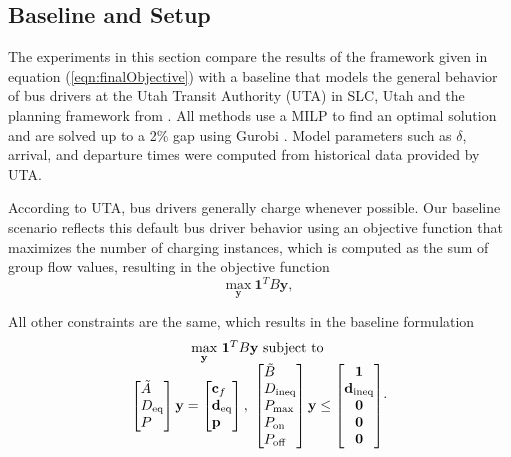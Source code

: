 \subsection{\label{sec:setup} Baseline and Setup}
The experiments in this section compare the results of the framework given in equation (\ref{eqn:finalObjective}) with a baseline that models the general behavior of bus drivers at the Utah Transit Authority (UTA) in SLC, Utah and the planning framework from \cite{He_2022_Battery}. All methods use a MILP to find an optimal solution and are solved up to a 2\% gap using Gurobi \cite{gurobi}. Model parameters such as $\delta$, arrival, and departure times were computed from historical data provided by UTA.
\par According to UTA, bus drivers generally charge whenever possible. Our baseline scenario reflects this default bus driver behavior using an objective function that maximizes the number of charging instances, which is computed as the sum of group flow values, resulting in the objective function
\begin{equation}
	\underset{\mathbf{y}}{\text{max}} \ \mathbf{1}^TB\mathbf{y},
\end{equation}
\par All other constraints are the same, which results in the baseline formulation 
\begin{equation}\label{eqn:finalBaselineObjective}
	\begin{matrix*}[c]
		\underset{\mathbf{y}}{\scalebox{1}{\text{max}}} \ \mathbf{1}^TB\mathbf{y} \ \text{subject to}\\
		\begin{bmatrix*}[l]
				\tilde{A} \\
				D_{\text{eq}} \\
				P
				\end{bmatrix*} \mathbf{y} = \begin{bmatrix*}[l]\mathbf{c}_f \\ \mathbf{d}_{\text{eq}}\\\mathbf{p} \end{bmatrix*}, \ \begin{bmatrix*}[l]
			\tilde{B} \\
			D_{\text{ineq}} \\ 
			P_{\text{max}} \\
			P_{\text{on}} \\
			P_{\text{off}}
			\end{bmatrix*}\mathbf{y} \le \begin{bmatrix*}\mathbf{1} \\ \mathbf{d}_{\text{ineq}} \\ \mathbf{0} \\ \mathbf{0} \\ \mathbf{0} \end{bmatrix*}
	\end{matrix*}.
\end{equation}
